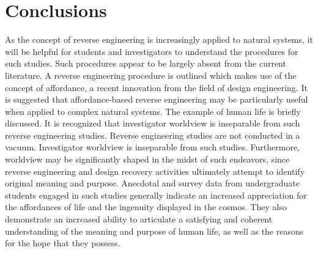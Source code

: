 \section{Conclusions}

As the concept of reverse engineering is increasingly applied to natural
systems, it will be helpful for students and investigators to
understand the procedures for such studies. Such procedures appear to
be largely absent from the current literature. A reverse engineering
procedure is outlined which makes use of the concept of affordance, a
recent innovation from the field of design engineering. It is suggested
that affordance-based reverse engineering may be particularly useful
when applied to complex natural systems. The example of human life is
briefly discussed. It is recognized that investigator worldview is
inseparable from such reverse engineering studies. Reverse engineering
studies are not conducted in a vacuum. Investigator worldview is
inseparable from such studies. Furthermore, worldview may be
significantly shaped in the midst of such endeavors, since reverse
engineering and design recovery activities ultimately attempt to
identify original meaning and purpose. Anecdotal and survey data from
undergraduate students engaged in such studies generally indicate an
increased appreciation for the affordances of life and the ingenuity
displayed in the cosmos. They also demonstrate an increased ability to
articulate a satisfying and coherent understanding of the meaning and
purpose of human life, as well as the reasons for the hope that they
possess.



